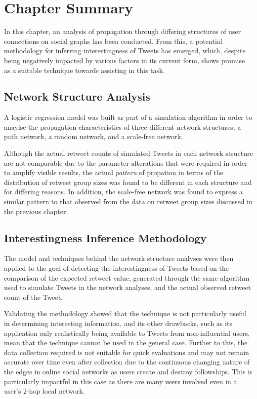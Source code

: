 \section{Chapter Summary}
In this chapter, an analysis of propagation through differing structures of user connections on social graphs has been conducted. From this, a potential methodology for inferring interestingness of Tweets has emerged, which, despite being negatively impacted by various factors in its current form, shows promise as a suitable technique towards assisting in this task.


\subsection{Network Structure Analysis}
A logistic regression model was built as part of a simulation algorithm in order to anaylse the propagation characteristics of three different network structures; a path network, a random network, and a scale-free network. 

Although the actual retweet counts of simulated Tweets in each network structure are not comparable due to the parameter alterations that were required in order to amplify visible results, the actual \textit{pattern} of propation in terms of the distribution of retweet group sizes was found to be different in each structure and for differing reasons. In addition, the scale-free network was found to express a similar pattern to that observed from the data on retweet group sizes discussed in the previous chapter.


\subsection{Interestingness Inference Methodology}
The model and techniques behind the network structure analyses were then applied to the goal of detecting the interestingness of Tweets based on the comparison of the expected retweet value, generated through the same algorithm used to simulate Tweets in the network analyses, and the actual observed retweet count of the Tweet.

Validating the methodology showed that the technique is not particularly useful in determining interesting information, and its other drawbacks, such as its application only realistically being available to Tweets from non-influential users, mean that the technique cannot be used in the general case. Further to this, the data collection required is not suitable for quick evaluations and may not remain accurate over time even after collection due to the continuous changing nature of the edges in online social networks as users create and destroy followships. This is particularly impactful in this case as there are many users involved even in a user's 2-hop local network.

